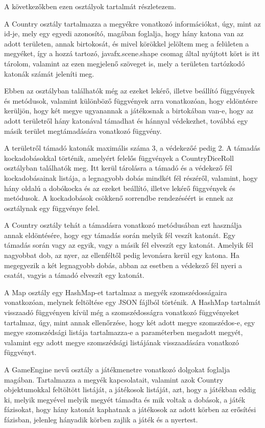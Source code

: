 A következőkben ezen osztályok tartalmát részletezem. 

A Country osztály tartalmazza a megyékre vonatkozó információkat, úgy, mint az id-je, mely egy egyedi azonosító, magában foglalja, hogy hány katona van az adott területen, annak birtokosát, és mivel körökkel jelöltem meg a felületen a megyéket, így a hozzá tartozó, javafx.scene.shape csomag által nyújtott kört is itt tárolom, valamint az ezen megjelenő szöveget is, mely a területen tartózkodó katonák számát jeleníti meg. 

Ebben az osztályban találhatók még az ezeket lekérő, illetve beállító függvények és metódusok, valamint különböző függvények arra vonatkozóan, hogy eldöntésre kerüljön, hogy két megye ugyanannak a játékosnak a birtokában van-e, hogy az adott területről hány katonával támadhat és hánnyal védekezhet, továbbá egy másik terület megtámadására vonatkozó függvény. 

A területről támadó katonák maximális száma 3, a védekezőé pedig 2. A támadás kockadobásokkal történik, amelyért felelős függvények a CountryDiceRoll osztályban találhatók meg. Itt kerül tárolásra a támadó és a védekező fél kockadobásainak listája, a legnagyobb dobás mindkét fél részéről, valamint, hogy hány oldalú a dobókocka és az ezeket beállító, illetve lekérő függvények és metódusok. A kockadobások csökkenő sorrendbe rendezéséért is ennek az osztálynak egy függvénye felel. 

A Country osztály tehát a támadásra vonatkozó metódusában ezt használja annak eldöntésére, hogy egy támadás során melyik fél veszít katonát. Egy támadás során vagy az egyik, vagy a másik fél elveszít egy katonát. Amelyik fél nagyobbat dob, az nyer, az ellenféltől pedig levonásra kerül egy katona. Ha megegyezik a két legnagyobb dobás, abban az esetben a védekező fél nyeri a csatát, vagyis a támadó elveszít egy katonát. 

A Map osztály egy HashMap-et tartalmaz a megyék szomszédosságaira vonatkozóan, melynek feltöltése egy JSON fájlból történik. A HashMap tartalmát visszaadó függvényen kívül még a szomszédosságra vonatkozó függvényeket tartalmaz, úgy, mint annak ellenőrzése, hogy két adott megye szomszédos-e, egy megye szomszédsági listája tartalmazza-e a paraméterben megadott megyét, valamint egy adott megye szomszédsági listájának visszaadására vonatkozó függvényt. 

A GameEngine nevű osztály a játékmenetre vonatkozó dolgokat foglalja magában. Tartalmazza a megyék kapcsolatait, valamint azok Country objektumokkal feltöltött listáját, a játékosok listáját, azt, hogy a játékban eddig ki, melyik megyével melyik megyét támadta és mik voltak a dobások, a játék fázisokat, hogy hány katonát kaphatnak a játékosok az adott körben az erősítési fázisban, jelenleg hányadik körben zajlik a játék és a nyertest. 

